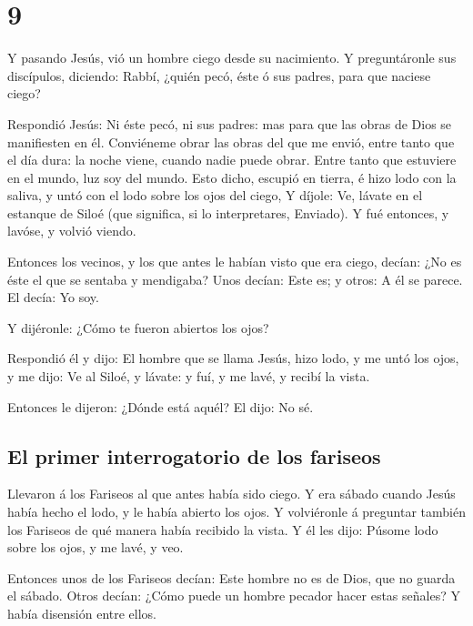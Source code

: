 \hypertarget{section-43-9}{%
\section{9}\label{section-43-9}}

 Y pasando Jesús, vió un hombre ciego desde su nacimiento.
 Y preguntáronle sus discípulos, diciendo: Rabbí, ¿quién
pecó, éste ó sus padres, para que naciese ciego?

 Respondió Jesús: Ni éste pecó, ni sus padres: mas para
que las obras de Dios se manifiesten en él.  Conviéneme
obrar las obras del que me envió, entre tanto que el día dura: la noche
viene, cuando nadie puede obrar.  Entre tanto que
estuviere en el mundo, luz soy del mundo.  Esto dicho,
escupió en tierra, é hizo lodo con la saliva, y untó con el lodo sobre
los ojos del ciego,  Y díjole: Ve, lávate en el estanque
de Siloé (que significa, si lo interpretares, Enviado). Y fué entonces,
y lavóse, y volvió viendo.

 Entonces los vecinos, y los que antes le habían visto que
era ciego, decían: ¿No es éste el que se sentaba y mendigaba?
 Unos decían: Este es; y otros: A él se parece. El decía:
Yo soy.

 Y dijéronle: ¿Cómo te fueron abiertos los ojos?

 Respondió él y dijo: El hombre que se llama Jesús, hizo
lodo, y me untó los ojos, y me dijo: Ve al Siloé, y lávate: y fuí, y me
lavé, y recibí la vista.

 Entonces le dijeron: ¿Dónde está aquél? El dijo: No sé.

\hypertarget{el-primer-interrogatorio-de-los-fariseos}{%
\subsection{El primer interrogatorio de los
fariseos}\label{el-primer-interrogatorio-de-los-fariseos}}

 Llevaron á los Fariseos al que antes había sido ciego.
 Y era sábado cuando Jesús había hecho el lodo, y le
había abierto los ojos.  Y volviéronle á preguntar
también los Fariseos de qué manera había recibido la vista. Y él les
dijo: Púsome lodo sobre los ojos, y me lavé, y veo.

 Entonces unos de los Fariseos decían: Este hombre no es
de Dios, que no guarda el sábado. Otros decían: ¿Cómo puede un hombre
pecador hacer estas señales? Y había disensión entre ellos.

